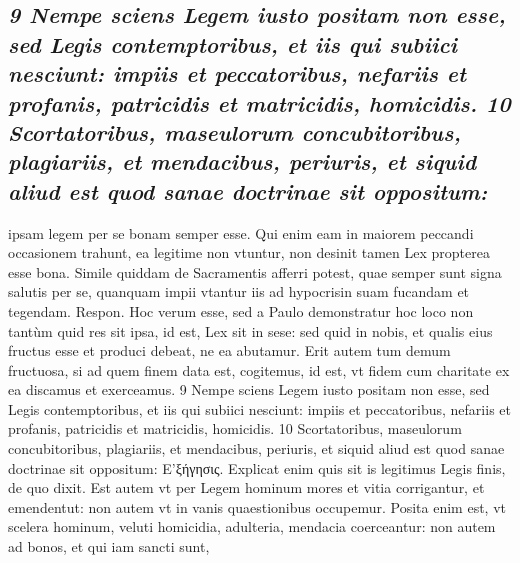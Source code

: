 \documentclass{article}
\begin{document}
\begin{pages}
\subsection*{\textit{9 Nempe sciens Legem iusto positam non esse, sed Legis contemptoribus, et iis qui subiici nesciunt: impiis et peccatoribus, nefariis et profanis, patricidis et matricidis, homicidis. 10 Scortatoribus, maseulorum concubitoribus, plagiariis, et mendacibus, periuris, et siquid aliud est quod sanae doctrinae sit oppositum:}}ipsam legem per se bonam semper esse. Qui enim eam in maiorem peccandi occasionem trahunt, ea legitime non vtuntur, non desinit tamen Lex propterea esse bona. Simile quiddam de Sacramentis afferri potest, quae semper sunt signa salutis per se, quanquam impii vtantur iis ad hypocrisin suam fucandam et tegendam. Respon. Hoc verum esse, sed a Paulo demonstratur hoc loco non tantùm quid res sit ipsa, id est, Lex sit in sese: sed quid in nobis, et qualis eius fructus esse et produci debeat, ne ea abutamur. Erit autem tum demum fructuosa, si ad quem finem data est, cogitemus, id est, vt fidem cum charitate ex ea discamus et exerceamus. 9 Nempe sciens Legem iusto positam non esse, sed Legis contemptoribus, et iis qui subiici nesciunt: impiis et peccatoribus, nefariis et profanis, patricidis et matricidis, homicidis. 10 Scortatoribus, maseulorum concubitoribus, plagiariis, et mendacibus, periuris, et siquid aliud est quod sanae doctrinae sit oppositum: E’ξήγησις. Explicat enim quis sit is legitimus Legis finis, de quo dixit. Est autem vt per Legem hominum mores et vitia corrigantur, et emendentut: non autem vt in vanis quaestionibus occupemur. Posita enim est, vt scelera hominum, veluti homicidia, adulteria, mendacia coerceantur: non autem ad bonos, et qui iam sancti sunt,  \pend

\end{pages}
\end{document}

